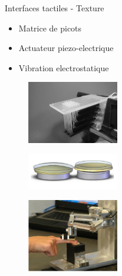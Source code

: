 \begin{frame}{Interfaces tactiles - Texture}
\begin{multicols}{2}

\begin{itemize}
\item Matrice de picots
\item Actuateur piezo-electrique
\item Vibration electrostatique
\end{itemize}

\begin{figure}
\centering
\includegraphics[width=4cm]{images/texture}
\caption{\cite{Yang2008}}
\end{figure}

\begin{figure}
\centering
\includegraphics[width=4cm]{images/piezo}
\end{figure}

\begin{figure}
\centering
\includegraphics[width=4cm]{images/piezo2}
\caption{\cite{Winfield2007}}
\end{figure}

\end{multicols}




\end{frame}

